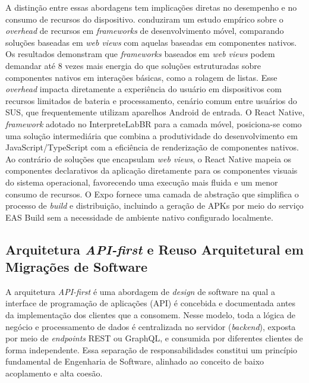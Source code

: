 \documentclass[12pt]{article}
\begin{document}
A distinção entre essas abordagens tem implicações diretas no desempenho e
no consumo de recursos do dispositivo. \cite{oliveira2023} conduziram um
estudo empírico sobre o \textit{overhead} de recursos em
\textit{frameworks} de desenvolvimento móvel, comparando soluções baseadas
em \textit{web views} com aquelas baseadas em componentes nativos. Os
resultados demonstram que \textit{frameworks} baseados em \textit{web views}
podem demandar até 8 vezes mais energia do que soluções estruturadas sobre
componentes nativos em interações básicas, como a rolagem de listas. Esse
\textit{overhead} impacta diretamente a experiência do usuário em
dispositivos com recursos limitados de bateria e processamento, cenário
comum entre usuários do SUS, que frequentemente utilizam aparelhos Android
de entrada. O React Native, \textit{framework} adotado no InterpreteLabBR
para a camada móvel, posiciona-se como uma solução intermediária que combina
a produtividade do desenvolvimento em JavaScript/TypeScript com a eficiência
de renderização de componentes nativos. Ao contrário de soluções que
encapsulam \textit{web views}, o React Native mapeia os componentes
declarativos da aplicação diretamente para os componentes visuais do sistema
operacional, favorecendo uma execução mais fluida e um menor consumo de
recursos. O Expo fornece uma camada de abstração que simplifica o processo
de \textit{build} e distribuição, incluindo a geração de APKs por meio do
serviço EAS Build sem a necessidade de ambiente nativo configurado
localmente.

\subsection{Arquitetura \textit{API-first} e Reuso Arquitetural em Migrações de Software}

A arquitetura \textit{API-first} é uma abordagem de \textit{design} de
software na qual a interface de programação de aplicações (API) é concebida
e documentada antes da implementação dos clientes que a consomem. Nesse
modelo, toda a lógica de negócio e processamento de dados é centralizada no
servidor (\textit{backend}), exposta por meio de \textit{endpoints} REST ou
GraphQL, e consumida por diferentes clientes de forma independente. Essa
separação de responsabilidades constitui um princípio fundamental de
Engenharia de Software, alinhado ao conceito de baixo acoplamento e alta
coesão.
\end{document}
